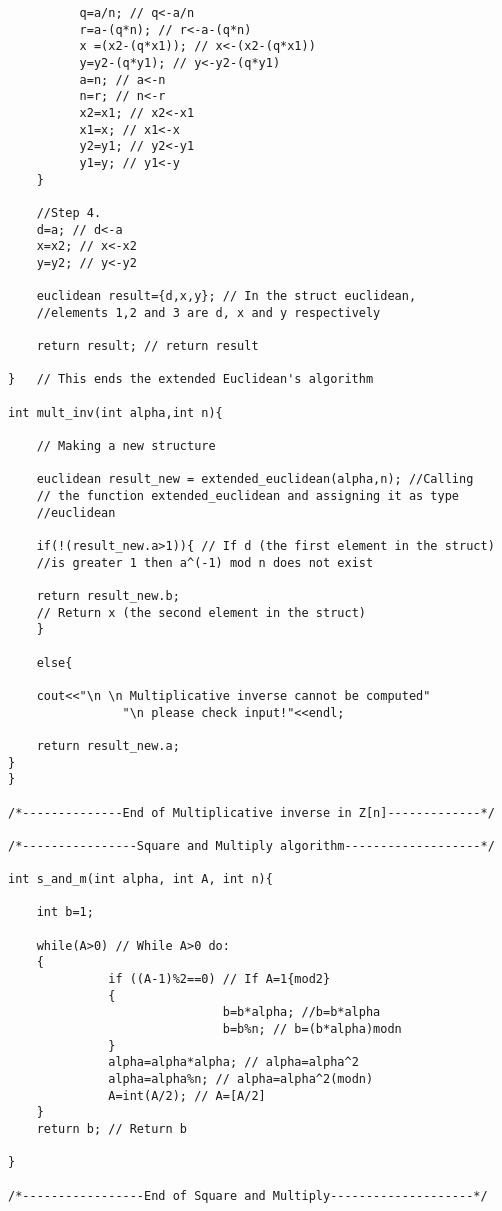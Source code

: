 \documentclass[iwp,first]{luthesis}
\begin{document}
\begin{verbatim}
          q=a/n; // q<-a/n
          r=a-(q*n); // r<-a-(q*n)
          x =(x2-(q*x1)); // x<-(x2-(q*x1))
          y=y2-(q*y1); // y<-y2-(q*y1)
          a=n; // a<-n
          n=r; // n<-r
          x2=x1; // x2<-x1
          x1=x; // x1<-x
          y2=y1; // y2<-y1
          y1=y; // y1<-y
    }
    
    //Step 4.
    d=a; // d<-a
    x=x2; // x<-x2
    y=y2; // y<-y2
    
    euclidean result={d,x,y}; // In the struct euclidean, 
    //elements 1,2 and 3 are d, x and y respectively
    
    return result; // return result
    
}   // This ends the extended Euclidean's algorithm

int mult_inv(int alpha,int n){
        
    // Making a new structure

    euclidean result_new = extended_euclidean(alpha,n); //Calling 
    // the function extended_euclidean and assigning it as type 
    //euclidean
    
    if(!(result_new.a>1)){ // If d (the first element in the struct) 
    //is greater 1 then a^(-1) mod n does not exist 

    return result_new.b; 
    // Return x (the second element in the struct)
    }

    else{

    cout<<"\n \n Multiplicative inverse cannot be computed"
                "\n please check input!"<<endl;
    
    return result_new.a; 
}   
}

/*--------------End of Multiplicative inverse in Z[n]-------------*/

/*----------------Square and Multiply algorithm-------------------*/

int s_and_m(int alpha, int A, int n){
    
    int b=1;
    
    while(A>0) // While A>0 do:
    {
              if ((A-1)%2==0) // If A=1{mod2}
              {
                              b=b*alpha; //b=b*alpha
                              b=b%n; // b=(b*alpha)modn
              }
              alpha=alpha*alpha; // alpha=alpha^2
              alpha=alpha%n; // alpha=alpha^2(modn)
              A=int(A/2); // A=[A/2]
    }
    return b; // Return b
    
}

/*-----------------End of Square and Multiply--------------------*/ 


\end{verbatim}
\end{document}
